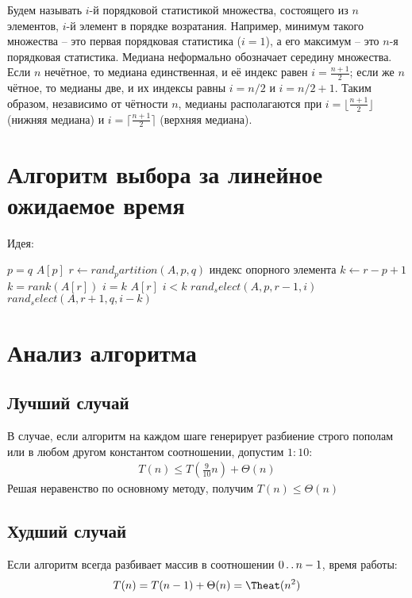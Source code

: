 \documentclass[11pt]{article}
\begin{document}
Будем называть $i$-й порядковой статистикой множества, состоящего из $n$ элементов, $i$-й элемент в порядке возратания. Например, минимум такого множества -- это первая порядковая статистика ($i = 1$), а его максимум -- это $n$-я порядковая статистика. Медиана неформально обозначает середину множества. Если $n$ нечётное, то медиана единственная, и её индекс равен $i = \frac{n+1}{2}$; если же $n$ чётное, то медианы две, и их индексы равны $i=n/2$ и $i=n/2 +1$. Таким образом, независимо от чётности $n$, медианы располагаются при $i = \lfloor \frac{n+1}{2} \rfloor$ (нижняя медиана) и $i = \lceil \frac{n+1}{2} \rceil$ (верхняя медиана).

\section{Алгоритм выбора за линейное ожидаемое время}

Идея: 

\begin{codebox}
\li \If $p = q$
\li \Then \Return $A[p]$
\li $r \gets rand_partition(A, p, q)$ \Comment индекс опорного элемента
\li $k \gets r - p + 1$ \Comment $k = rank(A[r])$
\li \If $i = k$
\li \Then \Return $A[r]$
\li \ElseIf $i < k$
\li \Then \Return $rand_select(A, p, r-1, i)$
\li \Else \Return $rand_select(A, r+1, q, i-k)$
  \End
\End
\end{codebox}

\section{Анализ алгоритма}

\subsection{Лучший случай}
В случае, если алгоритм на каждом шаге генерирует разбиение строго пополам или в любом другом константом соотношении, допустим $1:10$:
\begin{align*}
  T(n) \leqslant T(\frac{9}{10}n) + \Theta(n)
\end{align*}
Решая неравенство по основному методу, получим $T(n) \leqslant \Theta(n)$

\subsection{Худший случай}

Если алгоритм всегда разбивает массив в соотношении $0 \mathinner{\ldotp\ldotp} n-1$, время работы:
\begin{equation*}
  T(n) = T(n-1) + \Theta(n) = \Theat(n^2)
\end{equation*}
\end{document}
